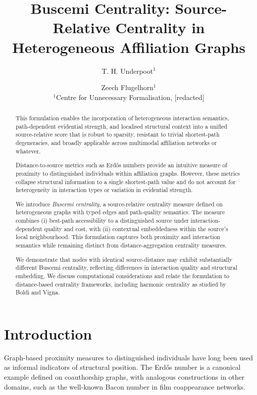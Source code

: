 \documentclass[11pt]{article}
\title{Buscemi Centrality: Source-Relative Centrality in Heterogeneous Affiliation Graphs}
\author{
T. H. Underpoot$^{1}$ \and Zeech Flugelhorn$^{1}$ \\
$^{1}$Centre for Unnecessary Formalisation, [redacted]
}
\date{}
\begin{document}
\maketitle
\thispagestyle{empty}
\pagestyle{empty}

\begin{abstract}
This formulation enables the incorporation of heterogeneous interaction semantics, path-dependent evidential strength, and localised structural context into a unified source-relative score that is robust to sparsity, resistant to trivial shortest-path degeneracies, and broadly applicable across multimodal affiliation networks or whatever.

Distance-to-source metrics such as Erd\H{o}s numbers provide an intuitive measure of proximity to distinguished individuals within affiliation graphs. However, these metrics collapse structural information to a single shortest-path value and do not account for heterogeneity in interaction types or variation in evidential strength.

We introduce \emph{Buscemi centrality}, a source-relative centrality measure defined on heterogeneous graphs with typed edges and path-quality semantics. The measure combines (i) best-path accessibility to a distinguished source under interaction-dependent quality and cost, with (ii) contextual embeddedness within the source's local neighbourhood. This formulation captures both proximity and interaction semantics while remaining distinct from distance-aggregation centrality measures.

We demonstrate that nodes with identical source-distance may exhibit substantially different Buscemi centrality, reflecting differences in interaction quality and structural embedding. We discuss computational considerations and relate the formulation to distance-based centrality frameworks, including harmonic centrality as studied by Boldi and Vigna.
\end{abstract}

\section{Introduction}

Graph-based proximity measures to distinguished individuals have long been used as informal indicators of structural position. The Erd\H{o}s number is a canonical example defined on coauthorship graphs, with analogous constructions in other domains, such as the well-known Bacon number in film coappearance networks.
\end{document}
